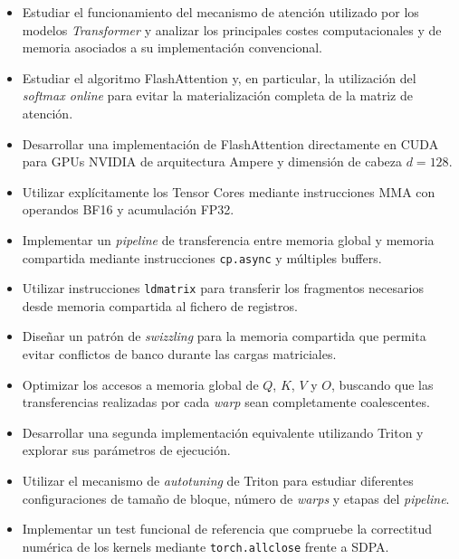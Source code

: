 \begin{itemize}

\item Estudiar el funcionamiento del mecanismo de atención utilizado por los modelos \textit{Transformer} y analizar los principales costes computacionales y de memoria asociados a su implementación convencional.

\item Estudiar el algoritmo FlashAttention y, en particular, la utilización del \textit{softmax online} para evitar la materialización completa de la matriz de atención.

\item Desarrollar una implementación de FlashAttention directamente en CUDA para GPUs NVIDIA de arquitectura Ampere y dimensión de cabeza \(d=128\).

\item Utilizar explícitamente los Tensor Cores mediante instrucciones MMA con operandos BF16 y acumulación FP32.

\item Implementar un \textit{pipeline} de transferencia entre memoria global y memoria compartida mediante instrucciones \texttt{cp.async} y múltiples buffers.

\item Utilizar instrucciones \texttt{ldmatrix} para transferir los fragmentos necesarios desde memoria compartida al fichero de registros.

\item Diseñar un patrón de \textit{swizzling} para la memoria compartida que permita evitar conflictos de banco durante las cargas matriciales.

\item Optimizar los accesos a memoria global de \(Q\), \(K\), \(V\) y \(O\), buscando que las transferencias realizadas por cada \textit{warp} sean completamente coalescentes.

\item Desarrollar una segunda implementación equivalente utilizando Triton y explorar sus parámetros de ejecución.

\item Utilizar el mecanismo de \textit{autotuning} de Triton para estudiar diferentes configuraciones de tamaño de bloque, número de \textit{warps} y etapas del \textit{pipeline}.

\item Implementar un test funcional de referencia que compruebe la correctitud numérica de los kernels mediante \texttt{torch.allclose} frente a SDPA.


\end{itemize}
